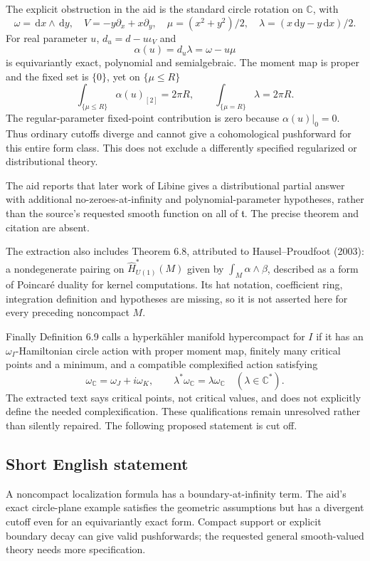 \documentclass[11pt]{article}
\newcommand{\C}{\mathbb{C}}
\newcommand{\dd}{\,\mathrm{d}}
\begin{document}
The explicit obstruction in the aid is the standard circle rotation on \(\C\), with
\[
 \omega=\dd x\wedge\dd y,\quad
 V=-y\partial_x+x\partial_y,\quad
 \mu=(x^2+y^2)/2,\quad
 \lambda=(x\dd y-y\dd x)/2.
\]
For real parameter \(u\), \(d_u=d-u\iota_V\) and
\[
 \alpha(u)=d_u\lambda=\omega-u\mu
\]
is equivariantly exact, polynomial and semialgebraic. The moment map is proper and the fixed set is \(\{0\}\), yet on \(\{\mu\leq R\}\)
\[
 \int_{\{\mu\leq R\}}\alpha(u)_{[2]}=2\pi R,
 \qquad \int_{\{\mu=R\}}\lambda=2\pi R.
\]
The regular-parameter fixed-point contribution is zero because \(\alpha(u)|_0=0\). Thus ordinary cutoffs diverge and cannot give a cohomological pushforward for this entire form class. This does not exclude a differently specified regularized or distributional theory.

The aid reports that later work of Libine gives a distributional partial answer with additional no-zeroes-at-infinity and polynomial-parameter hypotheses, rather than the source's requested smooth function on all of \(\mathfrak t\). The precise theorem and citation are absent.

The extraction also includes Theorem 6.8, attributed to Hausel--Proudfoot (2003): a nondegenerate pairing on \(\widehat H^*_{U(1)}(M)\) given by \(\int_M\alpha\wedge\beta\), described as a form of Poincaré duality for kernel computations. Its hat notation, coefficient ring, integration definition and hypotheses are missing, so it is not asserted here for every preceding noncompact \(M\).

Finally Definition 6.9 calls a hyperkähler manifold hypercompact for \(I\) if it has an \(\omega_I\)-Hamiltonian circle action with proper moment map, finitely many critical points and a minimum, and a compatible complexified action satisfying
\[
 \omega_{\C}=\omega_J+i\omega_K,\qquad
 \lambda^*\omega_{\C}=\lambda\omega_{\C}\quad(\lambda\in\C^*).
\]
The extracted text says critical points, not critical values, and does not explicitly define the needed complexification. These qualifications remain unresolved rather than silently repaired. The following proposed statement is cut off.
\subsection{Short English statement}
A noncompact localization formula has a boundary-at-infinity term. The aid's exact circle-plane example satisfies the geometric assumptions but has a divergent cutoff even for an equivariantly exact form. Compact support or explicit boundary decay can give valid pushforwards; the requested general smooth-valued theory needs more specification.
\end{document}
